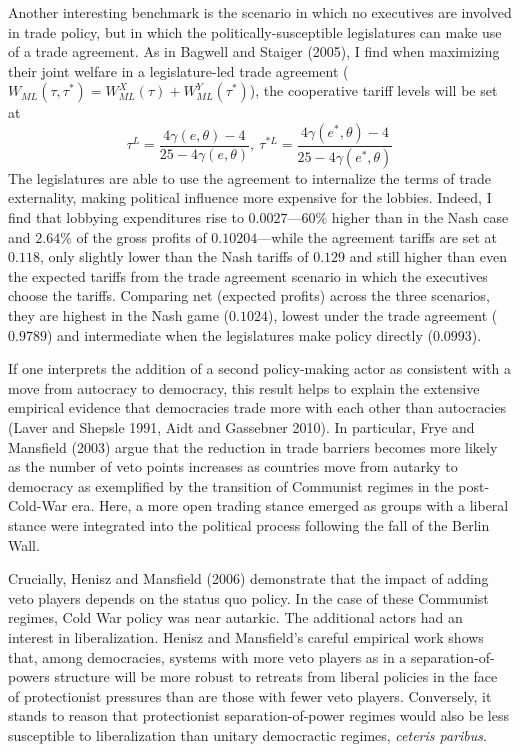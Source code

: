 \documentclass[10pt]{article}
\newcommand{\ve}{\theta}
\newcommand{\ga}{\gamma}
\begin{document}
Another interesting benchmark is the scenario in which no executives are involved in trade policy, but in which the politically-susceptible legislatures can make use of a trade agreement. As in Bagwell and Staiger (2005), I find when maximizing their joint welfare in a legislature-led trade agreement ($W_{\mathit{ML}}(\tau, \tau^*) = W_{\mathit{ML}}^X(\tau) + W_{\mathit{ML}}^Y(\tau^*)$), the cooperative tariff levels will be set at
\[
  \tau^L = \frac{4\ga(e,\ve)-4}{25-4\ga(e,\ve)}, \ \tau^{*L} = \frac{4\ga(e^*,\ve)-4}{25-4\ga(e^*,\ve)}
\]
The legislatures are able to use the agreement to internalize the terms of trade externality, making political influence more expensive for the lobbies. Indeed, I find that lobbying expenditures rise to $0.0027$---60$\%$ higher than in the Nash case and $2.64\%$ of the gross profits of $0.10204$---while the agreement tariffs are set at $0.118$, only slightly lower than the Nash tariffs of $0.129$ and still higher than even the expected tariffs from the trade agreement scenario in which the executives choose the tariffs. Comparing net (expected profits) across the three scenarios, they are highest in the Nash game ($0.1024$), lowest under the trade agreement ($0.9789$) and intermediate when the legislatures make policy directly ($0.0993$).

If one interprets the addition of a second policy-making actor as consistent with a move from autocracy to democracy, this result helps to explain the extensive empirical evidence that democracies trade more with each other than autocracies (Laver and Shepsle 1991, Aidt and Gassebner 2010). In particular, Frye and Mansfield (2003) argue that the reduction in trade barriers becomes more likely as the number of veto points increases as countries move from autarky to democracy as exemplified by the transition of Communist regimes in the post-Cold-War era. Here, a more open trading stance emerged as groups with a liberal stance were integrated into the political process following the fall of the Berlin Wall.

Crucially, Henisz and Mansfield (2006) demonstrate that the impact of adding veto players depends on the status quo policy. In the case of these Communist regimes, Cold War policy was near autarkic. The additional actors had an interest in liberalization. Henisz and Mansfield's careful empirical work shows that, among democracies, systems with more veto players as in a separation-of-powers structure will be more robust to retreats from liberal policies in the face of protectionist pressures than are those with fewer veto players. Conversely, it stands to reason that protectionist separation-of-power regimes would also be less susceptible to liberalization than unitary democractic regimes, \textit{ceteris paribus}.
\end{document}
